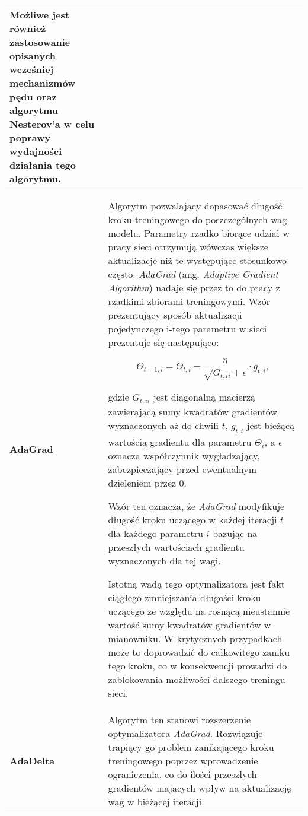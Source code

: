 \begin{enumerate}
\begin{small}
\begin{longtable}{ |m{2cm}|m{12cm}| }
       Możliwe jest również zastosowanie opisanych wcześniej mechanizmów pędu oraz
       algorytmu Nesterov'a w celu poprawy wydajności działania tego algorytmu. \\

     \hline
       \textbf{AdaGrad \cite{Adagrad}} &

        Algorytm pozwalający dopasować długość kroku treningowego do poszczególnych
        wag modelu. Parametry rzadko biorące udział w pracy sieci otrzymują wówczas
        większe aktualizacje niż te występujące stosunkowo często. \textit{AdaGrad} (ang. \textit{Adaptive Gradient Algorithm}) nadaje się
        przez to do pracy z rzadkimi zbiorami treningowymi. Wzór prezentujący sposób aktualizacji
        pojedynczego i-tego parametru w sieci prezentuje się następująco:

        \begin{equation}
        \Theta_{t+1,i} = \Theta_{t,i} - \frac{\eta}{\sqrt{G_{t,ii} + \epsilon}} \cdot g_{t,i},
      \end{equation}

        gdzie $G_{t,ii}$ jest diagonalną macierzą zawierającą sumy kwadratów gradientów
        wyznaczonych aż do chwili $t$, $g_{t,i}$ jest bieżącą wartością gradientu dla parametru $\Theta_i$, a
        $\epsilon$ oznacza współczynnik wygładzający, zabezpieczający przed ewentualnym dzieleniem
        przez 0.

        Wzór ten oznacza, że \textit{AdaGrad} modyfikuje długość kroku uczącego w każdej iteracji $t$
        dla każdego parametru $i$ bazując na przeszłych wartościach gradientu wyznaczonych
        dla tej wagi.

        Istotną wadą tego optymalizatora jest fakt ciągłego zmniejszania długości
        kroku uczącego ze względu na rosnącą nieustannie wartość sumy kwadratów
        gradientów w mianowniku. W krytycznych przypadkach może to doprowadzić
        do całkowitego zaniku tego kroku, co w konsekwencji prowadzi do
        zablokowania możliwości dalszego treningu sieci. \\

     \hline
       \textbf{AdaDelta \cite{Adadelta}} &

       Algorytm ten stanowi rozszerzenie optymalizatora \textit{AdaGrad}. Rozwiązuje
       trapiący go problem zanikającego kroku treningowego poprzez wprowadzenie
       ograniczenia, co do ilości przeszłych gradientów mających wpływ na aktualizację
       wag w bieżącej iteracji.


\end{longtable}
\end{small}
\end{enumerate}
